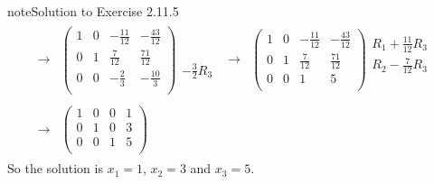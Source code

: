 \documentclass[letterpaper,10pt,english]{jupyterBook}
\begin{document}
\begin{sphinxadmonition}{note}{Solution to Exercise 2.11.5}
\begin{equation*}
\begin{split}
\begin{align*}
    \longrightarrow 
    & \left( \begin{array}{ccc|c} 
         1 & 0 & - \frac{11}{12} & - \frac{43}{12} \\ 
         0 & 1 & \frac{7}{12} & \frac{71}{12} \\ 
         0 & 0 & - \frac{2}{3} & - \frac{10}{3} \\ 
    \end{array} \right) 
    \begin{array}{l} \phantom{x} \\ \phantom{x} \\ - \frac{3}{2} R_{3}\end{array} & 
    \longrightarrow 
    & \left( \begin{array}{ccc|c} 
         1 & 0 & - \frac{11}{12} & - \frac{43}{12} \\ 
         0 & 1 & \frac{7}{12} & \frac{71}{12} \\ 
         0 & 0 & 1 & 5 \\ 
    \end{array} \right) 
    \begin{array}{l} R_{1} + \frac{11}{12} R_{3}\\ R_{2} - \frac{7}{12} R_{3} \\ \phantom{x} \end{array} \\ \\ 
    \longrightarrow 
    & \left( \begin{array}{ccc|c} 
         1 & 0 & 0 & 1 \\ 
         0 & 1 & 0 & 3 \\ 
         0 & 0 & 1 & 5 \\ 
    \end{array} \right) 
\end{align*} \end{split}
\end{equation*}
\sphinxAtStartPar
So the solution is \(x_{1} = 1\), \(x_{2} = 3\) and \(x_{3} = 5\).


\end{sphinxadmonition}
\end{document}
